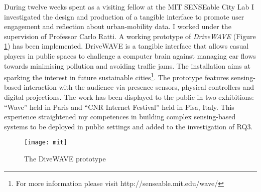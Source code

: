 During twelve weeks spent as a visiting fellow at the MIT SENSEable City Lab I investigated the design and production of a tangible interface to promote user engagement and reflection about urban-mobility data. I worked under the supervision of Professor Carlo Ratti. A working prototype of \emph{DriveWAVE} (Figure \ref{fig:drivewave}) has been implemented. DriveWAVE is a tangible interface that allows casual players in public spaces to challenge a computer brain against managing car flows towards minimising pollution and avoiding traffic jams. The installation aims at sparking the interest in future sustainable cities\footnote{For more information please visit http://senseable.mit.edu/wave/}. The prototype features sensing-based interaction with the audience via presence sensors, physical controllers and digital projections. The work has been displayed to the public in two exhibitions: ``Wave'' held in Paris and ``CNR Internet Festival'' held in Pisa, Italy. This experience straightened my competences in building complex sensing-based systems to be deployed in public settings and added to the investigation of RQ3.
\begin{figure}
	[h] \centering 
	\texttt{[image: mit]} \caption{The DiveWAVE prototype} \label{fig:drivewave} 
\end{figure}